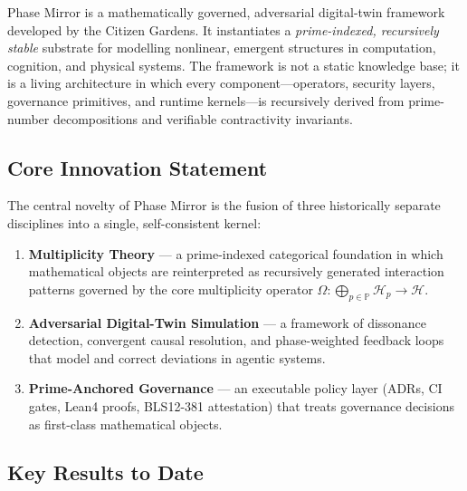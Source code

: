 \documentclass[12pt,a4paper]{article}
\theoremstyle{definition}
\theoremstyle{plain}
\theoremstyle{remark}
\begin{document}
Phase Mirror is a mathematically governed, adversarial digital-twin framework
developed by the Citizen Gardens. It instantiates a \emph{prime-indexed,
recursively stable} substrate for modelling nonlinear, emergent structures in
computation, cognition, and physical systems. The framework is not a static
knowledge base; it is a living architecture in which every component---operators,
security layers, governance primitives, and runtime kernels---is recursively
derived from prime-number decompositions and verifiable contractivity invariants.

\subsection{Core Innovation Statement}

The central novelty of Phase Mirror is the fusion of three historically separate
disciplines into a single, self-consistent kernel:

\begin{enumerate}[label=(\roman*)]
  \item \textbf{Multiplicity Theory} --- a prime-indexed categorical foundation
    in which mathematical objects are reinterpreted as recursively generated
    interaction patterns governed by the core multiplicity operator
    $\Omega : \bigoplus_{p \in \mathbb{P}} \mathcal{H}_p \to \mathcal{H}$.
  \item \textbf{Adversarial Digital-Twin Simulation} --- a framework of
    dissonance detection, convergent causal resolution, and phase-weighted
    feedback loops that model and correct deviations in agentic systems.
  \item \textbf{Prime-Anchored Governance} --- an executable policy layer
    (ADRs, CI gates, Lean4 proofs, BLS12-381 attestation) that treats
    governance decisions as first-class mathematical objects.
\end{enumerate}

\subsection{Key Results to Date}
\end{document}
